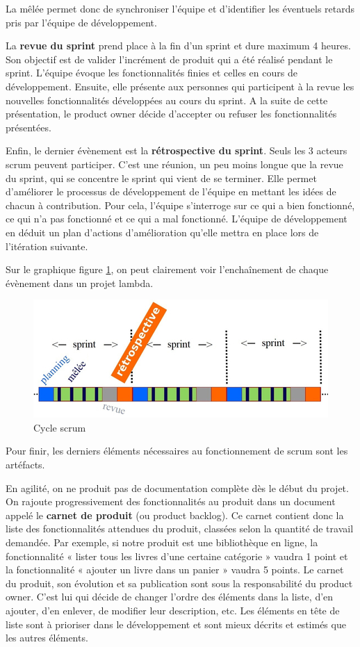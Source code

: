 \documentclass[12pt]{report}
\begin{document}
La mêlée permet donc de synchroniser l'équipe et d'identifier les éventuels retards pris par l'équipe de développement.

La \textbf{revue du sprint} prend place à la fin d'un sprint et dure maximum 4 heures. Son objectif est de valider l'incrément de produit qui a été réalisé pendant le sprint.
L'équipe évoque les fonctionnalités finies et celles en cours de développement. Ensuite, elle présente aux personnes qui participent à la revue les nouvelles fonctionnalités développées au cours du sprint.
A la suite de cette présentation, le product owner décide d'accepter ou refuser les fonctionnalités présentées.

Enfin, le dernier évènement est la \textbf{rétrospective du sprint}. Seuls les 3 acteurs scrum peuvent participer. C'est une réunion, un peu moins longue que la revue du sprint, qui se concentre le sprint qui vient de se terminer. Elle permet d'améliorer le processus de développement de l'équipe en mettant les idées de chacun à contribution. Pour cela, l'équipe s'interroge sur ce qui a bien fonctionné, ce qui n'a pas fonctionné et ce qui a mal fonctionné. L'équipe de développement en déduit un plan d'actions d'amélioration qu'elle mettra en place lors de l'itération suivante.

Sur le graphique figure \ref{fig:scrum}, on peut clairement voir l'enchaînement de chaque évènement dans un projet lambda.
\begin{figure}[htp]
  \centering
  \includegraphics[scale=0.8]{images/events_scrum}
  \caption{Cycle scrum}
  \label{fig:scrum}
\end{figure}

Pour finir, les derniers éléments nécessaires au fonctionnement de scrum sont les artéfacts.

En agilité, on ne produit pas de documentation complète dès le début du projet. On rajoute progressivement des fonctionnalités au produit dans un document appelé le \textbf{carnet de produit} (ou product backlog). Ce carnet contient donc la liste des fonctionnalités attendues du produit, classées selon la quantité de travail demandée. Par exemple, si notre produit est une bibliothèque en ligne, la fonctionnalité « lister tous les livres d'une certaine catégorie » vaudra 1 point et la fonctionnalité « ajouter un livre dans un panier » vaudra 5 points. Le carnet du produit, son évolution et sa publication sont sous la responsabilité du product owner. C'est lui qui décide de changer l'ordre des éléments dans la liste, d'en ajouter, d'en enlever, de modifier leur description, etc. Les éléments en tête de liste sont à prioriser dans le développement et sont mieux décrits et estimés que les autres éléments.
\end{document}
